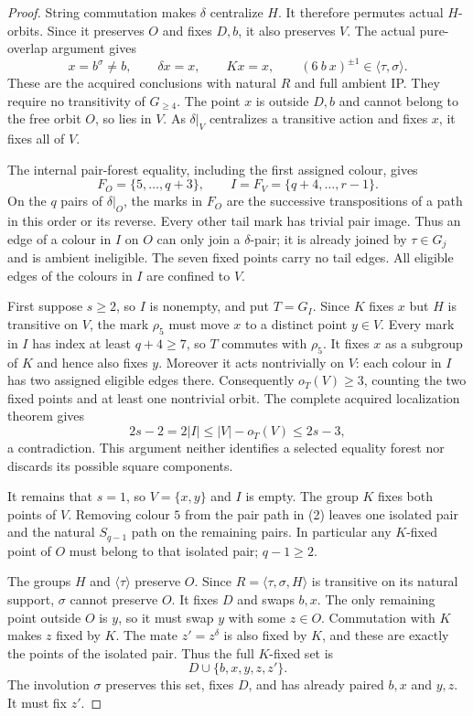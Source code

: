\documentclass[11pt,a4paper]{article}
\newcommand{\gen}[1]{\langle#1\rangle}
\begin{document}
\begin{proof}
String commutation makes $\delta$ centralize $H$.
It therefore permutes actual $H$-orbits. Since it
preserves $O$ and fixes $D,b$, it also preserves $V$.
The actual pure-overlap argument gives
\[
 x=b^\sigma\ne b,\qquad \delta x=x,
 \qquad Kx=x,\qquad
 (6\ b\ x)^{\pm1}\in\gen{\tau,\sigma}.                 \tag{1}
\]
These are the acquired conclusions with natural $R$
and full ambient IP. They require no transitivity of
$G_{\ge4}$. The point $x$ is outside $D,b$ and cannot
belong to the free orbit $O$, so lies in $V$.
As $\delta|_V$ centralizes a transitive action and
fixes $x$, it fixes all of $V$.

The internal pair-forest equality, including the
first assigned colour, gives
\[
 F_O=\{5,\ldots,q+3\},\qquad
 I=F_V=\{q+4,\ldots,r-1\}.                             \tag{2}
\]
On the $q$ pairs of $\delta|_O$, the marks in $F_O$
are the successive transpositions of a path in this
order or its reverse. Every other tail mark has
trivial pair image. Thus an edge of a colour in $I$
on $O$ can only join a $\delta$-pair; it is already
joined by $\tau\in G_j$ and is ambient ineligible.
The seven fixed points carry no tail edges. All eligible
edges of the colours in $I$ are confined to $V$.

First suppose $s\ge2$, so $I$ is nonempty, and put
$T=G_I$. Since $K$ fixes $x$ but $H$ is transitive
on $V$, the mark $\rho_5$ must move $x$ to a distinct
point $y\in V$. Every mark in $I$ has index at least
$q+4\ge7$, so $T$ commutes with $\rho_5$. It fixes
$x$ as a subgroup of $K$ and hence also fixes $y$.
Moreover it acts nontrivially on $V$: each colour
in $I$ has two assigned eligible edges there.
Consequently $o_T(V)\ge3$, counting the two fixed
points and at least one nontrivial orbit.
The complete acquired localization theorem gives
\[
             2s-2=2|I|\le |V|-o_T(V)\le2s-3,
\]
a contradiction. This argument neither identifies a
selected equality forest nor discards its possible
square components.

It remains that $s=1$, so $V=\{x,y\}$ and $I$ is
empty. The group $K$ fixes both points of $V$.
Removing colour $5$ from the pair path in (2) leaves
one isolated pair and the natural $S_{q-1}$ path on
the remaining pairs. In particular any $K$-fixed
point of $O$ must belong to that isolated pair;
$q-1\ge2$.

The groups $H$ and $\gen\tau$ preserve $O$. Since
$R=\gen{\tau,\sigma,H}$ is transitive on its natural
support, $\sigma$ cannot preserve $O$. It fixes $D$
and swaps $b,x$. The only remaining point outside
$O$ is $y$, so it must swap $y$ with some $z\in O$.
Commutation with $K$ makes $z$ fixed by $K$.
The mate $z'=z^\delta$ is also fixed by $K$, and
these are exactly the points of the isolated pair.
Thus the full $K$-fixed set is
\[
                       D\cup\{b,x,y,z,z'\}.
\]
The involution $\sigma$ preserves this set, fixes
$D$, and has already paired $b,x$ and $y,z$.
It must fix $z'$.


\end{proof}
\end{document}
